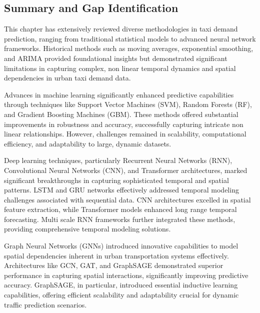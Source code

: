 \documentclass{article}
\begin{document}

\subsection{Summary and Gap Identification}

This chapter has extensively reviewed diverse methodologies in taxi demand prediction, ranging from traditional statistical models to advanced neural network frameworks. Historical methods such as moving averages, exponential smoothing, and ARIMA provided foundational insights but demonstrated significant limitations in capturing complex, non linear temporal dynamics and spatial dependencies in urban taxi demand data.

Advances in machine learning significantly enhanced predictive capabilities through techniques like Support Vector Machines (SVM), Random Forests (RF), and Gradient Boosting Machines (GBM). These methods offered substantial improvements in robustness and accuracy, successfully capturing intricate non linear relationships. However, challenges remained in scalability, computational efficiency, and adaptability to large, dynamic datasets.

Deep learning techniques, particularly Recurrent Neural Networks (RNN), Convolutional Neural Networks (CNN), and Transformer architectures, marked significant breakthroughs in capturing sophisticated temporal and spatial patterns. LSTM and GRU networks effectively addressed temporal modeling challenges associated with sequential data. CNN architectures excelled in spatial feature extraction, while Transformer models enhanced long range temporal forecasting. Multi scale RNN frameworks further integrated these methods, providing comprehensive temporal modeling solutions.

Graph Neural Networks (GNNs) introduced innovative capabilities to model spatial dependencies inherent in urban transportation systems effectively. Architectures like GCN, GAT, and GraphSAGE demonstrated superior performance in capturing spatial interactions, significantly improving predictive accuracy. GraphSAGE, in particular, introduced essential inductive learning capabilities, offering efficient scalability and adaptability crucial for dynamic traffic prediction scenarios.
\end{document}
